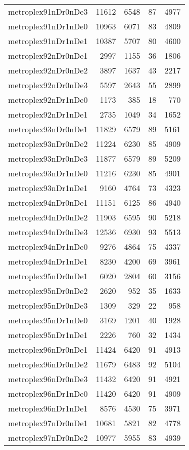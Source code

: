 \begin{longtable}{lrrrr}
metroplex91nDr0nDe3 & 11612 & 6548 & 87 & 4977 \\
metroplex91nDr1nDe0 & 10963 & 6071 & 83 & 4809 \\
metroplex91nDr1nDe1 & 10387 & 5707 & 80 & 4600 \\
metroplex92nDr0nDe1 & 2997 & 1155 & 36 & 1806 \\
metroplex92nDr0nDe2 & 3897 & 1637 & 43 & 2217 \\
metroplex92nDr0nDe3 & 5597 & 2643 & 55 & 2899 \\
metroplex92nDr1nDe0 & 1173 & 385 & 18 & 770 \\
metroplex92nDr1nDe1 & 2735 & 1049 & 34 & 1652 \\
metroplex93nDr0nDe1 & 11829 & 6579 & 89 & 5161 \\
metroplex93nDr0nDe2 & 11224 & 6230 & 85 & 4909 \\
metroplex93nDr0nDe3 & 11877 & 6579 & 89 & 5209 \\
metroplex93nDr1nDe0 & 11216 & 6230 & 85 & 4901 \\
metroplex93nDr1nDe1 & 9160 & 4764 & 73 & 4323 \\
metroplex94nDr0nDe1 & 11151 & 6125 & 86 & 4940 \\
metroplex94nDr0nDe2 & 11903 & 6595 & 90 & 5218 \\
metroplex94nDr0nDe3 & 12536 & 6930 & 93 & 5513 \\
metroplex94nDr1nDe0 & 9276 & 4864 & 75 & 4337 \\
metroplex94nDr1nDe1 & 8230 & 4200 & 69 & 3961 \\
metroplex95nDr0nDe1 & 6020 & 2804 & 60 & 3156 \\
metroplex95nDr0nDe2 & 2620 & 952 & 35 & 1633 \\
metroplex95nDr0nDe3 & 1309 & 329 & 22 & 958 \\
metroplex95nDr1nDe0 & 3169 & 1201 & 40 & 1928 \\
metroplex95nDr1nDe1 & 2226 & 760 & 32 & 1434 \\
metroplex96nDr0nDe1 & 11424 & 6420 & 91 & 4913 \\
metroplex96nDr0nDe2 & 11679 & 6483 & 92 & 5104 \\
metroplex96nDr0nDe3 & 11432 & 6420 & 91 & 4921 \\
metroplex96nDr1nDe0 & 11420 & 6420 & 91 & 4909 \\
metroplex96nDr1nDe1 & 8576 & 4530 & 75 & 3971 \\
metroplex97nDr0nDe1 & 10681 & 5821 & 82 & 4778 \\
metroplex97nDr0nDe2 & 10977 & 5955 & 83 & 4939 \\

\end{longtable}
